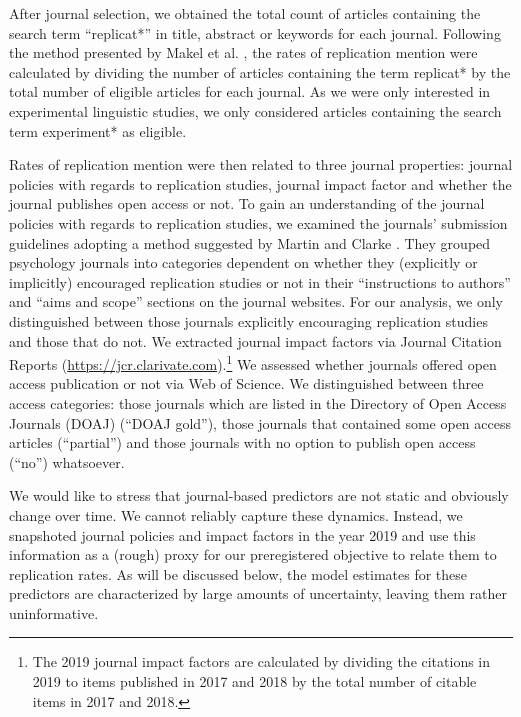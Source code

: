 \documentclass[cm,linguex]{glossa}
\begin{document}
After journal selection, we obtained the total count of articles containing the search term ``replicat*'' in title, abstract or keywords for each journal.
Following the method presented by Makel et al. \citeyearpar{makel_replications_2012}, the rates of replication mention were calculated by dividing the number of articles containing the term replicat* by the total number of eligible articles for each journal. As we were only interested in experimental linguistic studies, we only considered articles containing the search term experiment* as eligible.

Rates of replication mention were then related to three journal properties: journal policies with regards to replication studies, journal impact factor and whether the journal publishes open access or not.
To gain an understanding of the journal policies with regards to replication studies, we examined the journals' submission guidelines adopting a method suggested by Martin and Clarke \citeyearpar{martin_are_2017}.
They grouped psychology journals into categories dependent on whether they (explicitly or implicitly) encouraged replication studies or not in their ``instructions to authors'' and ``aims and scope'' sections on the journal websites. For our analysis, we only distinguished between those journals explicitly encouraging replication studies and those that do not.
We extracted journal impact factors via Journal Citation Reports (\url{https://jcr.clarivate.com}).\footnote{The 2019 journal impact factors are calculated by dividing the citations in 2019 to items published in 2017 and 2018 by the total number of citable items in 2017 and 2018.}
We assessed whether journals offered open access publication or not via Web of Science.
We distinguished between three access categories: those journals which are listed in the Directory of Open Access Journals (DOAJ) (``DOAJ gold''), those journals that contained some open access articles (``partial'') and those journals with no option to publish open access (``no'') whatsoever.

We would like to stress that journal-based predictors are not static and obviously change over time. We cannot reliably capture these dynamics. Instead, we snapshoted journal policies and impact factors in the year 2019 and use this information as a (rough) proxy for our preregistered objective to relate them to replication rates. As will be discussed below, the model estimates for these predictors are characterized by large amounts of uncertainty, leaving them rather uninformative.
\end{document}
